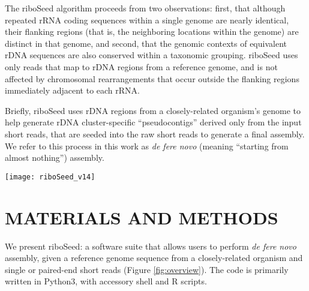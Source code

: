 \documentclass[a4,center,fleqn]{NAR}
\begin{document}
The riboSeed algorithm proceeds from two observations: first, that although repeated rRNA coding sequences within a single genome are nearly identical, their flanking regions (that is, the neighboring locations within the genome) are distinct in that genome, and second, that the genomic contexts of equivalent rDNA sequences are also conserved within a taxonomic grouping. riboSeed uses only reads that map to rDNA regions from a reference genome, and is not affected by chromosomal rearrangements that occur outside the flanking regions immediately adjacent to each rRNA.


Briefly, riboSeed uses rDNA regions from a closely-related organism's genome to help generate rDNA cluster-specific ``pseudocontigs'' derived only from the input short reads, that are seeded into the raw short reads to generate a final assembly. We refer to this process in this work as \textit{de fere novo} (meaning ``starting from almost nothing'') assembly.



\begin{figure*}[t]
  \begin{center}
  \texttt{[image: riboSeed\_v14]}
  \end{center}
  \caption{A comparison of \textit{de novo} assembly to \textit{de fere novo} assembly, as implemented in riboSeed. Reads are mapped to a reference genome, and those reads that align to rDNA and flanking regions are extracted. A subassembly for each group of reads that maps to an rDNA region is constructed to produce a ``pseudocontig'' for each region. These pseudocontigs are concatenated together separated by 1kb of Ns as a spacer. Reads are then iteratively mapped to the concatenated pseudocontigs, extracted, and again subassembled to each region. After the final iteration, the pseudocontigs are included with raw reads in a standard \textit{de novo} assembly. The subassemblies attempt to bridge proper rDNA regions by ensuring that flanking regions (represented here by colors) remain correctly paired. The \textit{de novo} assembly collapses the rDNAs, but \textit{de fere novo} places the rDNAs in the proper genomic context.
  }
  \label{fig:overview}
\end{figure*}


\section{MATERIALS AND METHODS}
We present riboSeed: a software suite that allows users to perform \textit{de fere novo} assembly, given a reference genome sequence from a closely-related organism and single or paired-end short reads (Figure \ref{fig:overview}). The code is primarily written in Python3, with accessory shell and R scripts.
\end{document}
